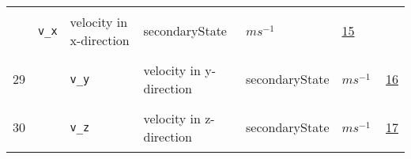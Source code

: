 \begin{longtable}{|p{1cm}|p{2.5cm}|p{4.5cm}|p{8cm}|p{3.0cm}|p{3cm}|p{1cm}|}
             & \verb|v_x|
             & velocity in x-direction
             & \begin{lay}secondaryState \end{lay}
             & $ m s^{-1} \, $
             &                 \hyperlink{"e:15"}{ 15 }
                 \\
        29
             & \hypertarget{"v:29"}{ $ {} $}
             & \verb|v_y|
             & velocity in y-direction
             & \begin{lay}secondaryState \end{lay}
             & $ m s^{-1} \, $
             &                 \hyperlink{"e:16"}{ 16 }
                 \\
        30
             & \hypertarget{"v:30"}{ $ {} $}
             & \verb|v_z|
             & velocity in z-direction
             & \begin{lay}secondaryState \end{lay}
             & $ m s^{-1} \, $
             &                 \hyperlink{"e:17"}{ 17 }
                 \\
    \end{longtable}